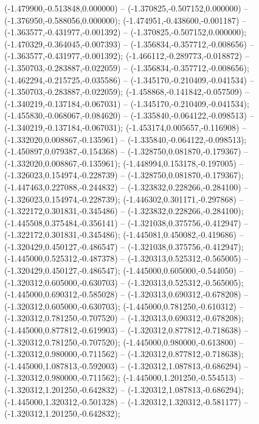  (-1.479900,-0.513848,0.000000) -- (-1.370825,-0.507152,0.000000) -- (-1.376950,-0.588056,0.000000);
 (-1.474951,-0.438600,-0.001187) -- (-1.363577,-0.431977,-0.001392) -- (-1.370825,-0.507152,0.000000);
 (-1.470329,-0.364045,-0.007393) -- (-1.356834,-0.357712,-0.008656) -- (-1.363577,-0.431977,-0.001392);
 (-1.466112,-0.289773,-0.018872) -- (-1.350703,-0.283887,-0.022059) -- (-1.356834,-0.357712,-0.008656);
 (-1.462294,-0.215725,-0.035586) -- (-1.345170,-0.210409,-0.041534) -- (-1.350703,-0.283887,-0.022059);
 (-1.458868,-0.141842,-0.057509) -- (-1.340219,-0.137184,-0.067031) -- (-1.345170,-0.210409,-0.041534);
 (-1.455830,-0.068067,-0.084620) -- (-1.335840,-0.064122,-0.098513) -- (-1.340219,-0.137184,-0.067031);
 (-1.453174,0.005657,-0.116908) -- (-1.332020,0.008867,-0.135961) -- (-1.335840,-0.064122,-0.098513);
 (-1.450897,0.079387,-0.154368) -- (-1.328750,0.081870,-0.179367) -- (-1.332020,0.008867,-0.135961);
 (-1.448994,0.153178,-0.197005) -- (-1.326023,0.154974,-0.228739) -- (-1.328750,0.081870,-0.179367);
 (-1.447463,0.227088,-0.244832) -- (-1.323832,0.228266,-0.284100) -- (-1.326023,0.154974,-0.228739);
 (-1.446302,0.301171,-0.297868) -- (-1.322172,0.301831,-0.345486) -- (-1.323832,0.228266,-0.284100);
 (-1.445508,0.375484,-0.356141) -- (-1.321038,0.375756,-0.412947) -- (-1.322172,0.301831,-0.345486);
 (-1.445081,0.450082,-0.419686) -- (-1.320429,0.450127,-0.486547) -- (-1.321038,0.375756,-0.412947);
 (-1.445000,0.525312,-0.487378) -- (-1.320313,0.525312,-0.565005) -- (-1.320429,0.450127,-0.486547);
 (-1.445000,0.605000,-0.544050) -- (-1.320312,0.605000,-0.630703) -- (-1.320313,0.525312,-0.565005);
 (-1.445000,0.690312,-0.585028) -- (-1.320313,0.690312,-0.678208) -- (-1.320312,0.605000,-0.630703);
 (-1.445000,0.781250,-0.610312) -- (-1.320312,0.781250,-0.707520) -- (-1.320313,0.690312,-0.678208);
 (-1.445000,0.877812,-0.619903) -- (-1.320312,0.877812,-0.718638) -- (-1.320312,0.781250,-0.707520);
 (-1.445000,0.980000,-0.613800) -- (-1.320312,0.980000,-0.711562) -- (-1.320312,0.877812,-0.718638);
 (-1.445000,1.087813,-0.592003) -- (-1.320312,1.087813,-0.686294) -- (-1.320312,0.980000,-0.711562);
 (-1.445000,1.201250,-0.554513) -- (-1.320312,1.201250,-0.642832) -- (-1.320312,1.087813,-0.686294);
 (-1.445000,1.320312,-0.501328) -- (-1.320312,1.320312,-0.581177) -- (-1.320312,1.201250,-0.642832);
